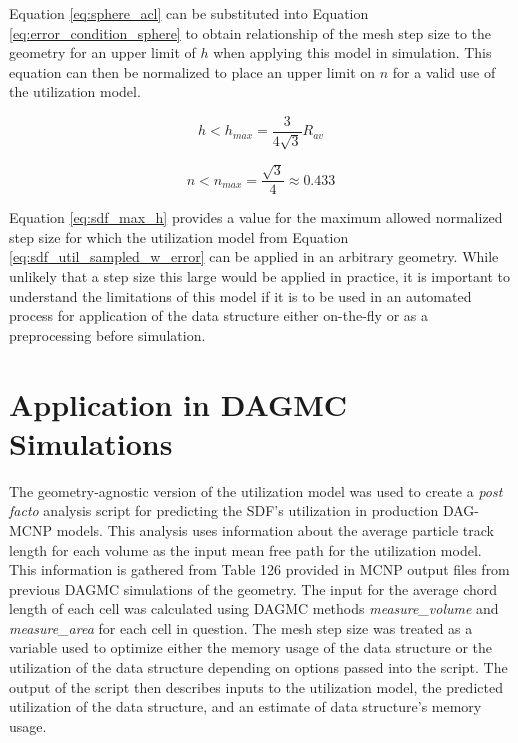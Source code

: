 Equation \ref{eq:sphere_acl} can be substituted into Equation
\ref{eq:error_condition_sphere} to obtain relationship of the mesh step size to
the geometry for an upper limit of $h$ when applying this model in
simulation. This equation can then be normalized to place an upper limit on $n$
for a valid use of the utilization model.

\begin{equation}
 h < h_{max} = \frac{3}{4\sqrt{3}} R_{av}
\end{equation}

\begin{equation}
 n < n_{max} = \frac{\sqrt{3}}{4} \approx 0.433
\label{eq:sdf_max_h}
\end{equation}

Equation \ref{eq:sdf_max_h} provides a value for the maximum allowed normalized
step size for which the utilization model from Equation
\ref{eq:sdf_util_sampled_w_error} can be applied in an arbitrary geometry. While
unlikely that a step size this large would be applied in practice, it is
important to understand the limitations of this model if it is to be used in an
automated process for application of the data structure either on-the-fly or as
a preprocessing before simulation.

\section{Application in DAGMC Simulations}

The geometry-agnostic version of the utilization model was used to create a
\textit{post facto} analysis script for predicting the SDF's utilization in
production DAG-MCNP models. This analysis uses information about the average
particle track length for each volume as the input mean free path for the
utilization model. This information is gathered from Table 126 provided in MCNP
output files from previous DAGMC simulations of the
geometry\cite{LANL_MCNP5_VOLIII}. The input for the average chord length of each
cell was calculated using DAGMC methods \textit{measure\_volume} and
\textit{measure\_area} for each cell in question. The mesh step size was treated
as a variable used to optimize either the memory usage of the data structure or
the utilization of the data structure depending on options passed into the
script. The output of the script then describes inputs to the utilization model,
the predicted utilization of the data structure, and an estimate of data
structure's memory usage.

